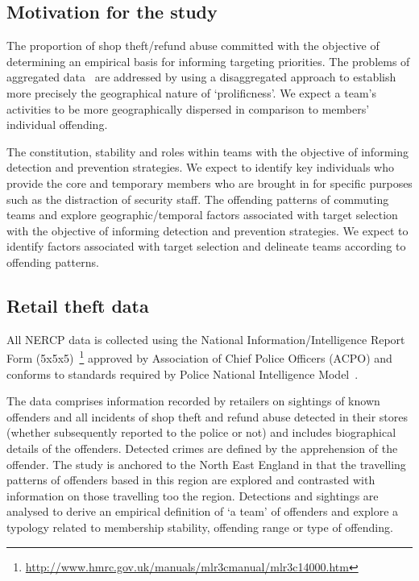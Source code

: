 \documentclass[conference]{IEEEtran}
\theoremstyle{definition}
\begin{document}
\subsection{Motivation for the study}
The proportion of shop theft/refund abuse committed with the objective
of determining an empirical basis for informing targeting
priorities. The problems of aggregated data~\cite{TownsleyPease2002}
are addressed by using a disaggregated approach to establish more
precisely the geographical nature of `prolificness'. We expect a
team’s activities to be more geographically dispersed in comparison to
members' individual offending.

The constitution, stability and roles within teams with the objective
of informing detection and prevention strategies.  We expect to
identify key individuals who provide the core and temporary members
who are brought in for specific purposes such as the distraction of
security staff. The offending patterns of commuting teams and explore
geographic/temporal factors associated with target selection with the
objective of informing detection and prevention strategies.  We expect
to identify factors associated with target selection and delineate
teams according to offending patterns. 

\subsection{Retail theft data}
All NERCP data is collected using the National
Information/Intelligence Report Form
(5x5x5)~\footnote{\url{http://www.hmrc.gov.uk/manuals/mlr3cmanual/mlr3c14000.htm}}
approved by Association of Chief Police Officers (ACPO) and conforms
to standards required by Police National Intelligence
Model~\cite{john+maguire:2004}.

The data comprises information recorded by retailers on sightings of
known offenders and all incidents of shop theft and refund abuse
detected in their stores (whether subsequently reported to the police
or not) and includes biographical details of the offenders.  Detected
crimes are defined by the apprehension of the offender. The study is
anchored to the North East England in that the travelling patterns of
offenders based in this region are explored and contrasted with
information on those travelling too the region. Detections and
sightings are analysed to derive an empirical definition of `a team'
of offenders and explore a typology related to membership stability,
offending range or type of offending.
\end{document}
